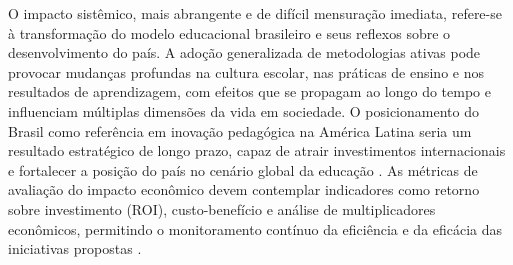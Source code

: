 O impacto sistêmico, mais abrangente e de difícil mensuração imediata, refere-se à transformação do modelo educacional brasileiro e seus reflexos sobre o desenvolvimento do país. A adoção generalizada de metodologias ativas pode provocar mudanças profundas na cultura escolar, nas práticas de ensino e nos resultados de aprendizagem, com efeitos que se propagam ao longo do tempo e influenciam múltiplas dimensões da vida em sociedade. O posicionamento do Brasil como referência em inovação pedagógica na América Latina seria um resultado estratégico de longo prazo, capaz de atrair investimentos internacionais e fortalecer a posição do país no cenário global da educação \cite{SOUSA2025}. As métricas de avaliação do impacto econômico devem contemplar indicadores como retorno sobre investimento (ROI), custo-benefício e análise de multiplicadores econômicos, permitindo o monitoramento contínuo da eficiência e da eficácia das iniciativas propostas \cite{TEODORO2024}.

